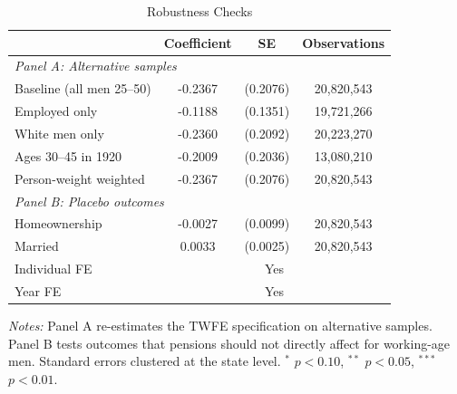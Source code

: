 \begin{table}[H]
\centering
\caption{Robustness Checks}
\label{tab:robustness}
\begin{threeparttable}
\begin{tabular}{lccc}
\toprule
 & Coefficient & SE & Observations \\
\midrule
\multicolumn{4}{l}{\textit{Panel A: Alternative samples}} \\
Baseline (all men 25--50) & -0.2367 & (0.2076) & 20,820,543 \\
Employed only & -0.1188 & (0.1351) & 19,721,266 \\
White men only & -0.2360 & (0.2092) & 20,223,270 \\
Ages 30--45 in 1920 & -0.2009 & (0.2036) & 13,080,210 \\
Person-weight weighted & -0.2367 & (0.2076) & 20,820,543 \\
\midrule
\multicolumn{4}{l}{\textit{Panel B: Placebo outcomes}} \\
Homeownership & -0.0027 & (0.0099) & 20,820,543 \\
Married & 0.0033 & (0.0025) & 20,820,543 \\
\midrule
Individual FE & \multicolumn{3}{c}{Yes} \\
Year FE & \multicolumn{3}{c}{Yes} \\
\bottomrule
\end{tabular}
\begin{tablenotes}[flushleft]\small
\item \textit{Notes:} Panel A re-estimates the TWFE specification on alternative samples. Panel B tests outcomes that pensions should not directly affect for working-age men. Standard errors clustered at the state level. $^{*}$ $p<0.10$, $^{**}$ $p<0.05$, $^{***}$ $p<0.01$.
\end{tablenotes}
\end{threeparttable}
\end{table}

